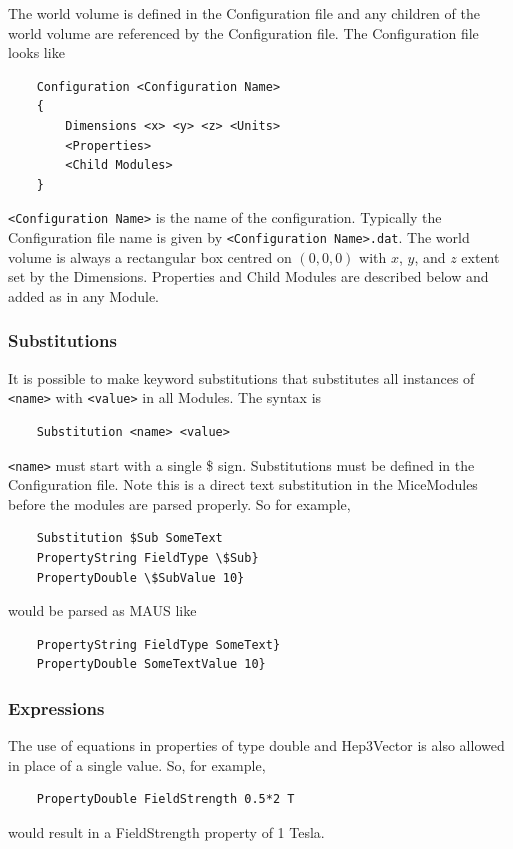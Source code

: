 The world volume is defined in the Configuration file and any children of the world volume are referenced by the
Configuration file. The Configuration file looks like

\begin{verbatim}
    Configuration <Configuration Name>
    {
        Dimensions <x> <y> <z> <Units>
        <Properties>
        <Child Modules>
    }
\end{verbatim}

\verb|<Configuration Name>| is the name of the configuration. Typically the Configuration file
name is given by \verb|<Configuration Name>.dat|. The world volume is always a rectangular box
centred on $(0,0,0)$ with $x$, $y$, and $z$ extent set by the Dimensions. Properties and Child Modules are described below and
added as in any Module.

\subsubsection{Substitutions}
It is possible to make keyword substitutions that substitutes all instances of \verb|<name>| with
\verb|<value>| in all Modules. The syntax is

\begin{verbatim}
    Substitution <name> <value>
\end{verbatim}

\verb|<name>| must start with a single \$ sign. Substitutions must be defined in the Configuration file.
Note this is a direct text substitution in the MiceModules before the modules are parsed properly. So for example,

\begin{verbatim}
    Substitution $Sub SomeText
    PropertyString FieldType \$Sub}
    PropertyDouble \$SubValue 10}
\end{verbatim}

would be parsed as MAUS like

\begin{verbatim}
    PropertyString FieldType SomeText}
    PropertyDouble SomeTextValue 10}
\end{verbatim}

\subsubsection{Expressions}
The use of equations in properties of type double and Hep3Vector is also allowed in place of a single value. So, for
example, 
\begin{verbatim}
    PropertyDouble FieldStrength 0.5*2 T
\end{verbatim}
would result in a FieldStrength property of 1 Tesla.\texttt{ }

